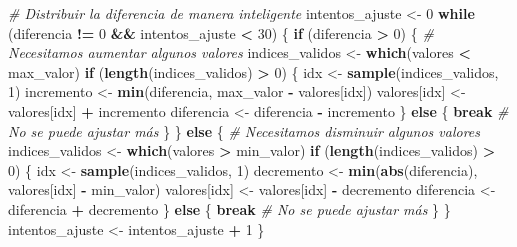 \documentclass[
]{article}
\newenvironment{Shaded}{\begin{snugshade}}{\end{snugshade}}
\newcommand{\CommentTok}[1]{\textcolor[rgb]{0.56,0.35,0.01}{\textit{#1}}}
\newcommand{\ControlFlowTok}[1]{\textcolor[rgb]{0.13,0.29,0.53}{\textbf{#1}}}
\newcommand{\DecValTok}[1]{\textcolor[rgb]{0.00,0.00,0.81}{#1}}
\newcommand{\FunctionTok}[1]{\textcolor[rgb]{0.13,0.29,0.53}{\textbf{#1}}}
\newcommand{\NormalTok}[1]{#1}
\newcommand{\OtherTok}[1]{\textcolor[rgb]{0.56,0.35,0.01}{#1}}
\newcommand{\SpecialCharTok}[1]{\textcolor[rgb]{0.81,0.36,0.00}{\textbf{#1}}}
\begin{document}
\begin{Shaded}
\begin{Highlighting}[]
    \CommentTok{\# Distribuir la diferencia de manera inteligente}
\NormalTok{    intentos\_ajuste }\OtherTok{\textless{}{-}} \DecValTok{0}
    \ControlFlowTok{while}\NormalTok{ (diferencia }\SpecialCharTok{!=} \DecValTok{0} \SpecialCharTok{\&\&}\NormalTok{ intentos\_ajuste }\SpecialCharTok{\textless{}} \DecValTok{30}\NormalTok{) \{}
      \ControlFlowTok{if}\NormalTok{ (diferencia }\SpecialCharTok{\textgreater{}} \DecValTok{0}\NormalTok{) \{}
        \CommentTok{\# Necesitamos aumentar algunos valores}
\NormalTok{        indices\_validos }\OtherTok{\textless{}{-}} \FunctionTok{which}\NormalTok{(valores }\SpecialCharTok{\textless{}}\NormalTok{ max\_valor)}
        \ControlFlowTok{if}\NormalTok{ (}\FunctionTok{length}\NormalTok{(indices\_validos) }\SpecialCharTok{\textgreater{}} \DecValTok{0}\NormalTok{) \{}
\NormalTok{          idx }\OtherTok{\textless{}{-}} \FunctionTok{sample}\NormalTok{(indices\_validos, }\DecValTok{1}\NormalTok{)}
\NormalTok{          incremento }\OtherTok{\textless{}{-}} \FunctionTok{min}\NormalTok{(diferencia, max\_valor }\SpecialCharTok{{-}}\NormalTok{ valores[idx])}
\NormalTok{          valores[idx] }\OtherTok{\textless{}{-}}\NormalTok{ valores[idx] }\SpecialCharTok{+}\NormalTok{ incremento}
\NormalTok{          diferencia }\OtherTok{\textless{}{-}}\NormalTok{ diferencia }\SpecialCharTok{{-}}\NormalTok{ incremento}
\NormalTok{        \} }\ControlFlowTok{else}\NormalTok{ \{}
          \ControlFlowTok{break}  \CommentTok{\# No se puede ajustar más}
\NormalTok{        \}}
\NormalTok{      \} }\ControlFlowTok{else}\NormalTok{ \{}
        \CommentTok{\# Necesitamos disminuir algunos valores}
\NormalTok{        indices\_validos }\OtherTok{\textless{}{-}} \FunctionTok{which}\NormalTok{(valores }\SpecialCharTok{\textgreater{}}\NormalTok{ min\_valor)}
        \ControlFlowTok{if}\NormalTok{ (}\FunctionTok{length}\NormalTok{(indices\_validos) }\SpecialCharTok{\textgreater{}} \DecValTok{0}\NormalTok{) \{}
\NormalTok{          idx }\OtherTok{\textless{}{-}} \FunctionTok{sample}\NormalTok{(indices\_validos, }\DecValTok{1}\NormalTok{)}
\NormalTok{          decremento }\OtherTok{\textless{}{-}} \FunctionTok{min}\NormalTok{(}\FunctionTok{abs}\NormalTok{(diferencia), valores[idx] }\SpecialCharTok{{-}}\NormalTok{ min\_valor)}
\NormalTok{          valores[idx] }\OtherTok{\textless{}{-}}\NormalTok{ valores[idx] }\SpecialCharTok{{-}}\NormalTok{ decremento}
\NormalTok{          diferencia }\OtherTok{\textless{}{-}}\NormalTok{ diferencia }\SpecialCharTok{+}\NormalTok{ decremento}
\NormalTok{        \} }\ControlFlowTok{else}\NormalTok{ \{}
          \ControlFlowTok{break}  \CommentTok{\# No se puede ajustar más}
\NormalTok{        \}}
\NormalTok{      \}}
\NormalTok{      intentos\_ajuste }\OtherTok{\textless{}{-}}\NormalTok{ intentos\_ajuste }\SpecialCharTok{+} \DecValTok{1}
\NormalTok{    \}}


\end{Highlighting}
\end{Shaded}
\end{document}
